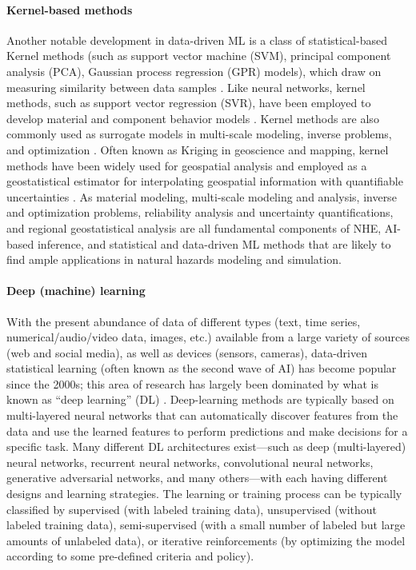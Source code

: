 \paragraph{Kernel-based methods} Another notable development in data-driven ML is a class of statistical-based Kernel methods (such as support vector machine (SVM), principal component analysis (PCA), Gaussian process regression (GPR) models), which draw on measuring similarity between data samples \citep{rasmussen2006gaussian, hofmann2008kernel}. Like neural networks, kernel methods, such as support vector regression (SVR), have been employed to develop material and component behavior models \citep[see, e.g.][]{luo2018machine}. Kernel methods are also commonly used as surrogate models in multi-scale modeling, inverse problems, and optimization \citep{wirtz2012surrogate, park2016bayesian, eriksson2018scalable, santin2019kernel}. Often known as Kriging in geoscience and mapping, kernel methods have been widely used for geospatial analysis and employed as a geostatistical estimator for interpolating geospatial information with quantifiable uncertainties \citep{olea2012geostatistics, jia2016surrogate}. As material modeling, multi-scale modeling and analysis, inverse and optimization problems, reliability analysis and uncertainty quantifications, and regional geostatistical analysis are all fundamental components of NHE, AI-based inference, and statistical and data-driven ML methods that are likely to find ample applications in natural hazards modeling and simulation. 

\paragraph{Deep (machine) learning} With the present abundance of data of different types (text, time series, numerical/audio/video data, images, etc.) available from a large variety of sources (web and social media), as well as devices (sensors, cameras), data-driven statistical learning (often known as the second wave of AI) has become popular since the 2000s; this area of research has largely been dominated by what is known as ``deep learning'' (DL) \citep{lecun2015deep}. Deep-learning methods are typically based on multi-layered neural networks that can automatically discover features from the data and use the learned features to perform predictions and make decisions for a specific task. Many different DL architectures exist---such as deep (multi-layered) neural networks, recurrent neural networks, convolutional neural networks, generative adversarial networks, and many others---with each having different designs and learning strategies. The learning or training process can be typically classified by supervised (with labeled training data), unsupervised (without labeled training data), semi-supervised (with a small number of labeled but large amounts of unlabeled data), or iterative reinforcements (by optimizing the model according to some pre-defined criteria and policy).

